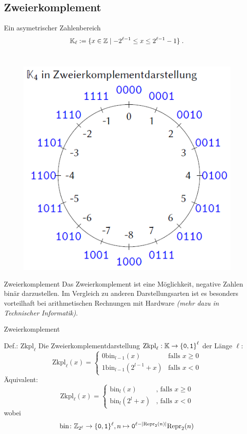 \subsection{Zweierkomplement}
\begin{frame}{Ein asymetrischer Zahlenbereich}
	\[
	\mathbb{K}_{\ell} := \{ x\in \mathbb{Z}\mid -2^{\ell-1} \leq x \leq 2^{\ell-1} -1 \} \;.
	\]
	\\[0.2cm]
	
	\begin{figure}
		\centering
		\includegraphics[scale=0.45]{ZK_K4}
	\end{figure}
\end{frame}

\begin{frame}{Zweierkomplement} %
    Das Zweierkomplement ist eine Möglichkeit, negative Zahlen binär darzustellen. Im Vergleich zu anderen Darstellungsarten ist es besonders vorteilhaft bei arithmetischen Rechnungen mit Hardware \textit{(mehr dazu in Technischer Informatik)}.
\end{frame}

\begin{frame}{Zweierkomplement}
	\begin{block}{Def.: $\text{Zkpl}_\ell$}
		Die Zweierkomplementdarstellung $ \text{Zkpl}_\ell: \mathbb{K} \to \left\{ \texttt{0}, \texttt{1} \right\}^\ell$ der Länge $\ell$:
		$$\text{Zkpl}_\ell(x) = \begin{cases} 0 \text{bin}_{l-1}(x) & \text{falls } x \geq 0 \\ 1 \text{bin}_{l-1}(2^{l-1}+x) & \text{falls } x < 0\end{cases}$$
		Äquivalent:
		$$\text{Zkpl}_\ell(x) = \begin{cases} \text{bin}_{l}(x) & \text{, falls } x \geq 0 \\ \text{bin}_{l}(2^{l}+x) & \text{, falls } x < 0\end{cases}$$
		wobei
		\[
			\text{bin} \colon \mathbb{Z}_{2^{\ell}} \to \{\texttt{0},\texttt{1}\}^{\ell}, n \mapsto \texttt{0}^{\ell- |\text{Repr}_2(n)|} \text{Repr}_2(n) 
		\]
	\end{block}
\end{frame}
